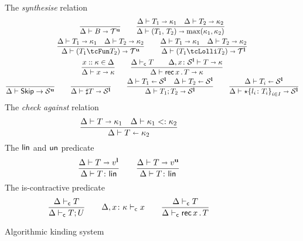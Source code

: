 \begin{figure}[h!]
  The \emph{synthesise} relation \hfill{}
  \begin{gather*}
    \frac{}{\algkindout{\tcBase}{\kindt^\Un}}
    \qquad 
    \frac{
      \algkindout{T_1}{\kind_1}
      \quad
      \algkindout{T_2}{\kind_2}
    }{
      \algkindout{\tPair{T_1}{T_2}}{\max(\kind_1, \kind_2)}
    }
    \\
    \frac{
      \algkindout{T_1}{\kind_1}
      \quad
      \algkindout{T_2}{\kind_2}
    }{
      \algkindout{(\tUnFun{T_1}{T_2})}{\kindt^\Un}
      }
    \qquad
    \frac{
      \algkindout{T_1}{\kind_1}
      \quad
      \algkindout{T_2}{\kind_2}
    }{
      \algkindout{(\tLinFun{T_1}{T_2})}{\kindt^\Lin}
    }
    \\
    \frac{x :: \kind \in \kindEnv}{\algkindout x \kind}
   \qquad
   \frac{
     \contractive T
     \qquad
     \algkindout[\kindEnv, x\colon \kinds^\Lin] T \kind
   }{
     \algkindout{\tRec xT}{\kind}
   }
    \\
    \frac{}{\kindEnv \Alg \tskip \rightarrow \kinds^\Un}
    \qquad 
    \frac{}{\algkindout{\tMsg T}{\kinds^\Lin}}
    \qquad
    \frac{
      \algkindin{T_1}{\kinds^\Lin}
      \quad
      \algkindin{T_2}{\kinds^\Lin}
    }{
      \algkindout{\tSemi{T_1}{T_2}}{\kinds^\Lin}
    }
    \qquad
    \frac{
      \algkindin{T_i}{\kinds^\Lin}
    }{
      \algkindout{\tChoice{\{l_i\colon T_i\}}_{i\in I}}{\kinds^\Lin}
    }
  \end{gather*}
  The \emph{check against} relation\hfill{}
  \begin{equation*}
    \frac{
      \algkindout{T}{\kind_1}
      \quad
      \subkind{\kind_1}{\kind_2}
    }{
      \algkindin T {\kind_2}
    }
  \end{equation*}
  The $\link$ and $\unk$ predicate  \hfill{}\quad{}
  \begin{equation*}
    \frac{
      \algkindout T {v^\Lin}
    }{
      \isLin T
    }
    \qquad
    \frac{
      \algkindout T {v^\Un}
    }{
      \isLin T
    }
  \end{equation*}
  The is-contractive predicate  \hfill{}\quad{}
  \begin{equation*}
    \frac{
      \contractive{T}
    }{
      \contractive{T;U}
    }
    \qquad
    \contractive[\kindEnv,x\colon\kind]{x}
    \qquad 
    \frac{
      \contractive{T}
    }{
      \contractive{\tRecK xT}
    }
  \end{equation*}
  \caption{Algorithmic kinding system}
  \label{fig:kinding-system}
\end{figure}

